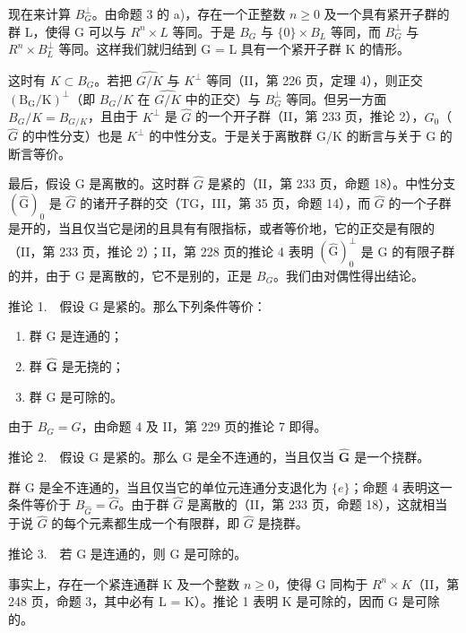 现在来计算 \(B_{G}^{\perp}\)。由命题 3 的 a)，存在一个正整数 \(n \geqslant 0\) 及一个具有紧开子群的群 L，使得 G 可以与 \(R^{n} \times L\) 等同。于是 \(B_{G}\) 与 \(\{0\} \times B_{L}\) 等同，而 \(B_{G}^{\perp}\) 与 \(R^{n} \times B_{L}^{\perp}\) 等同。这样我们就归结到 G = L 具有一个紧开子群 K 的情形。

这时有 \(K \subset B_{G}\)。若把 \(\widehat{G/K}\) 与 \(K^{\perp}\) 等同（II，第 226 页，定理 4），则正交 \((\mathrm{B}_{\mathrm{G}}/\mathrm{K})^{\perp}\)（即 \(B_{G}/K\) 在 \(\widehat{G/K}\) 中的正交）与 \(B_{G}^{\perp}\) 等同。但另一方面 \(B_{G}/K = B_{G/K}\)，且由于 \(K^{\perp}\) 是 \(\widehat{G}\) 的一个开子群（II，第 233 页，推论 2），\(\widehat{G}_{0}\)（\(\widehat{G}\) 的中性分支）也是 \(K^{\perp}\) 的中性分支。于是关于离散群 G/K 的断言与关于 G 的断言等价。

最后，假设 G 是离散的。这时群 \(\widehat{G}\) 是紧的（II，第 233 页，命题 18）。中性分支 \((\widehat{\mathrm{G}})_{0}\) 是 \(\widehat{G}\) 的诸开子群的交（TG，III，第 35 页，命题 14），而 \(\widehat{G}\) 的一个子群是开的，当且仅当它是闭的且具有有限指标，或者等价地，它的正交是有限的（II，第 233 页，推论 2）；II，第 228 页的推论 4 表明 \((\widehat{\mathrm{G}})_{0}^{\perp}\) 是 G 的有限子群的并，由于 G 是离散的，它不是别的，正是 \(B_{G}\)。我们由对偶性得出结论。

推论 1.　假设 G 是紧的。那么下列条件等价：

\begin{enumerate}
\def\labelenumi{(\roman{enumi})}
\item
  群 G 是连通的；
\item
  群 \(\widehat{\mathbf{G}}\) 是无挠的；
\item
  群 G 是可除的。
\end{enumerate}

由于 \(B_{G} = G\)，由命题 4 及 II，第 229 页的推论 7 即得。

推论 2.　假设 G 是紧的。那么 G 是全不连通的，当且仅当 \(\widehat{\mathbf{G}}\) 是一个挠群。

群 G 是全不连通的，当且仅当它的单位元连通分支退化为 \(\{e\}\)；命题 4 表明这一条件等价于 \(B_{\widehat{G}} = \widehat{G}\)。由于群 \(\widehat{G}\) 是离散的（II，第 233 页，命题 18），这就相当于说 \(\widehat{G}\) 的每个元素都生成一个有限群，即 \(\widehat{G}\) 是挠群。

推论 3.　若 G 是连通的，则 G 是可除的。

事实上，存在一个紧连通群 K 及一个整数 \(n \geqslant 0\)，使得 G 同构于 \(R^{n} \times K\)（II，第 248 页，命题 3，其中必有 L = K）。推论 1 表明 K 是可除的，因而 G 是可除的。


